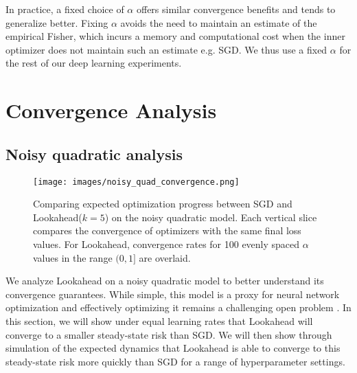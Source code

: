 \documentclass{article}
\begin{document}
In practice, a fixed choice of $\alpha$ offers similar convergence benefits and tends to generalize better. Fixing $\alpha$ avoids the need to maintain an estimate of the empirical Fisher, which incurs a memory and computational cost when the inner optimizer does not maintain such an estimate e.g. SGD. We thus use a fixed $\alpha$ for the rest of our deep learning experiments. 







    

 \section{Convergence Analysis}

\subsection{Noisy quadratic analysis}
\label{sec: noisyquadratic}

\begin{wrapfigure}{t}{0.5 \textwidth}
    \centering
    \vspace{-0.4cm}    \texttt{[image: images/noisy\_quad\_convergence.png]}    \vspace{-0.1cm}    \caption{Comparing expected optimization progress between SGD and Lookahead($k=5$) on the noisy quadratic model.  Each vertical slice compares the convergence of optimizers with the same final loss values. For Lookahead, convergence rates for 100 evenly spaced $\alpha$ values in the range $(0,1]$ are overlaid.}
    \label{fig:noisy_quad_convergence}
    \vspace{-0.4cm}\end{wrapfigure}

We analyze Lookahead on a noisy quadratic model to better understand its convergence guarantees. While simple, this model is a proxy for neural network optimization and effectively optimizing it remains a challenging open problem \citep{schaul2013no, martens2015optimizing, wu2018understanding, zhang2019algorithmic}. In this section, we will show under equal learning rates that Lookahead will converge to a smaller steady-state risk than SGD. We will then show through simulation of the expected dynamics that Lookahead is able to converge to this steady-state risk more quickly than SGD for a range of hyperparameter settings.
\end{document}

